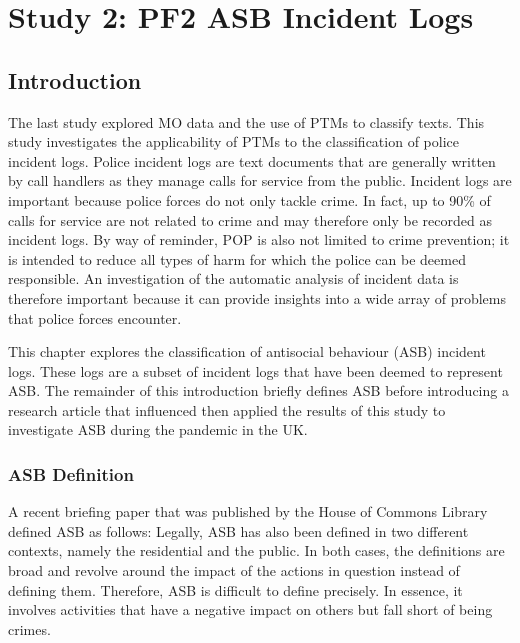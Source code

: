 
\chapter{Study 2: PF2 ASB Incident Logs}


\section{Introduction}

The last study explored MO data and the use of PTMs to classify texts. This study investigates the applicability of PTMs to the classification of police incident logs. Police incident logs are text documents that are generally written by call handlers as they manage calls for service from the public. Incident logs are important because police forces do not only tackle crime. In fact, up to 90\% of calls for service are not related to crime and may therefore only be recorded as incident logs. By way of reminder, POP is also not limited to crime prevention; it is intended to reduce all types of harm for which the police can be deemed responsible. An investigation of the automatic analysis of incident data is therefore important because it can provide insights into a wide array of problems that police forces encounter.

This chapter explores the classification of antisocial behaviour (ASB) incident logs. These logs are a subset of incident logs that have been deemed to represent ASB. The remainder of this introduction briefly defines ASB before introducing a research article that influenced then applied the results of this study to investigate ASB during the pandemic in the UK.


\subsection{ASB Definition}
A recent briefing paper that was published by the House of Commons Library   \parencite{brown_sturge_2021} defined ASB as follows:   Legally, ASB has also been defined in two different contexts, namely the residential and the public. In both cases, the definitions are broad and revolve around the impact of the actions in question instead of defining them. Therefore, ASB is difficult to define precisely. In essence, it involves activities that have a negative impact on others but fall short of being crimes.    
 
